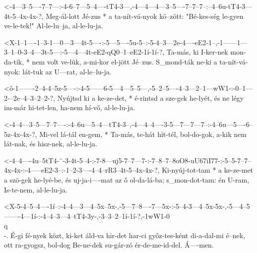 
  {<-4---3--5----7--7---:-4-6--7---5--4----tT4-3---,-4---4---4---3--5----7--7--7--:--4--6u-tT4-3---4t-5--4x-4x-?,}
  {  Meg-ál-lott Jé-zus * a ta-nít-vá-nyok kö--zött: "Bé-kes-ség le-gyen ve-le-tek!" Al-le-lu--ja, al-le-lu-ja.}

  {<X-1--1----1--3-1---0---3---4t-5----:-5---5----5u-5--:-5-4--3---2e-4----eE2-1--,-1------1---3--1--0-3--4---3t-5---:-5---4---4t-eE2-qQ0--1--eE2-1í-1í-?,}
  {   Ta-más, ki I-ker-nek mon-da-tik, * nem volt ve-lük, a-mi-kor el-jött Jé--zus. S_mond-ták ne-ki a ta-nít-vá-nyok: lát-tuk az U---rat, al-le--lu-ja.}

  {<ô-1-------2--4-4--5z-5----:-4-5------6-5---4---5--5---,-5--2--5----4--3---2--1---wW1-:-0--1---2-–2e--4--3--2--2-?,}
  {   Nyújtsd ki a ke-ze-det, * é-rintsd a sze-gek he-lyét, és ne légy im-már hi-tet-len,  ha-nem hí-vő, al-le-lu-ja.}

  {<-4--4---3--5---7--7----:-4--6u---5--4---tT4-3--,-4---4--4----3-5---7---7---7--:-4--6u---5----6--5z-4x-4x-?,}
  {  Mi-vel lá-tál en-gem, * Ta-más, te-hát hit-tél, bol-do-gok, a-kik nem lát-nak, és hisz-nek, al-le-lu-ja.}


  {<-4--4----4u--5tT4-¨-3-4t-5--4-:-7-8---uj5-7--7---7-:-7--8--7--8oO8-uU67iI77-:-5--5-7--7--4x-4x-:-4-----eE2-3--:-1--2-3----4--4--rR3--4t-5--4x-4x-?,}
  {  Ki-nyúj-tot-tam  * a ke-ze-met a szö-gek he-lyé-be, és uj-ja-i----mat        az ő ol-da-lá-ba;  s_mon-dot-tam: én U-ram, Is-te-nem, al-le-lu-ja.}



  {<X-5-4--5--4----1í--:-4--4---3---4--5x--5x-,-5---7--8----7---5x-:-5--4-3---4--5x-5x-,-5---4--5-------4---1í-:-4--4--3---4--tT4-3y-,-3--3--2--1í-1í-?,-1wW1-0\\q\\-.}
  {   É-gi fé-nyek közt, ki-ket áld-va hir-det  har-ci győz-tes-ként di-a-dal-mi é--nek, ott ra-gyogsz, bol-dog  Be-ne-dek su-gár-zó   ér-de-me-id-del.  Á----men.}

